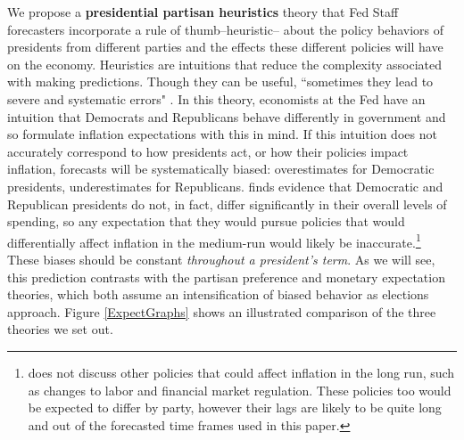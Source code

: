 \documentclass[a4paper]{article}\usepackage{graphicx, color}
\begin{document}
We propose a {\bf{presidential partisan heuristics}} theory that Fed Staff forecasters incorporate a rule of thumb--heuristic--\citep[see][]{kahneman1973, tverskykahneman1974, kahneman2003} about the policy behaviors of presidents from different parties and the effects these different policies will have on the economy. Heuristics are intuitions that reduce the complexity associated with making predictions. Though they can be useful, ``sometimes they lead to severe and systematic errors" \citep[][1124]{tverskykahneman1974}. In this theory, economists at the Fed have an intuition that Democrats and Republicans behave differently in government and so formulate inflation expectations with this in mind. If this intuition does not accurately correspond to how presidents act, or how their policies impact inflation, forecasts will be systematically biased: overestimates for Democratic presidents, underestimates for Republicans. \cite{Bartels2008} finds evidence that Democratic and Republican presidents do not, in fact, differ significantly in their overall levels of spending, so any expectation that they would pursue policies that would differentially affect inflation in the medium-run would likely be inaccurate.\footnote{\cite{Bartels2008} does not discuss other policies that could affect inflation in the long run, such as changes to labor and financial market regulation. These policies too would be expected to differ by party, however their lags are likely to be quite long and out of the forecasted time frames used in this paper.} These biases should be constant {\emph{throughout a president's term}}. As we will see, this prediction contrasts with the partisan preference and monetary expectation theories, which both assume an intensification of biased behavior as elections approach. Figure \ref{ExpectGraphs} shows an illustrated comparison of the three theories we set out.
\end{document}
